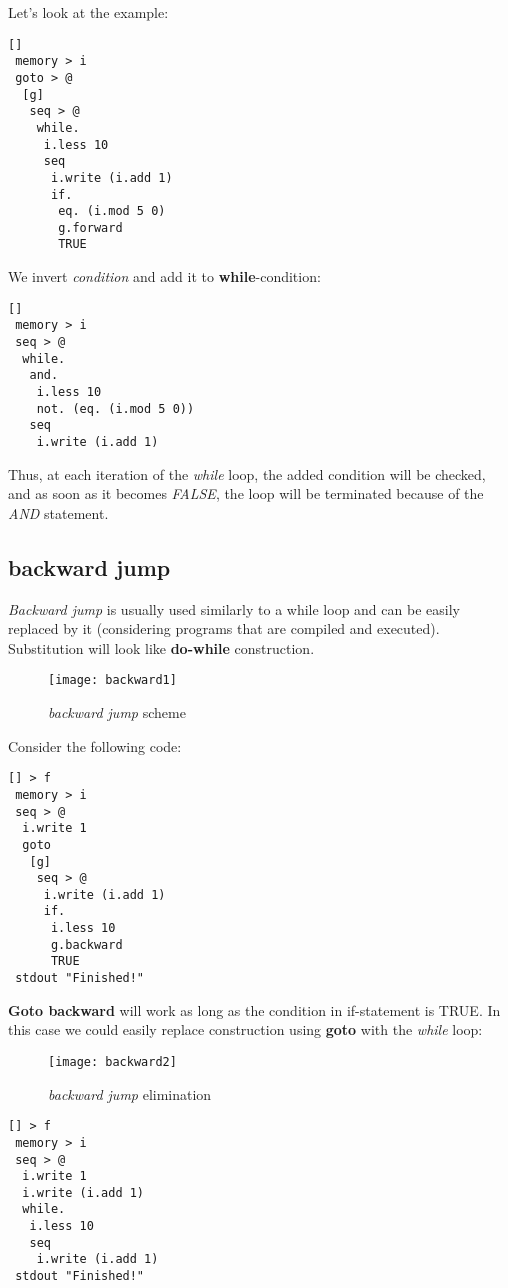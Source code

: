 \documentclass[two column]{article}
\begin{document}
Let's look at the example:
\begin{lstlisting}
[]
 memory > i
 goto > @
  [g]
   seq > @
    while.
     i.less 10
     seq
      i.write (i.add 1)
      if.
       eq. (i.mod 5 0)
       g.forward
       TRUE
\end{lstlisting}

We invert \textit{condition} and add it to \textbf{while}-condition:
\begin{lstlisting}
[]
 memory > i
 seq > @
  while.
   and.
    i.less 10
    not. (eq. (i.mod 5 0))
   seq
    i.write (i.add 1)
\end{lstlisting}

Thus, at each iteration of the \textit{while} loop, the added condition will be checked, and as soon as it becomes \textit{FALSE}, the loop will be terminated because of the \textit{AND} statement.

\subsection{backward jump}
\textit{Backward jump} is usually used similarly to a while loop and can be easily replaced by it (considering programs that are compiled and executed). Substitution will look like \textbf{do-while} construction.

\begin{figure}[h]
    \centering
    \texttt{[image: backward1]}
    \caption{\textit{backward jump} scheme}
    \label{fig:my_label}
\end{figure}

Consider the following code:
\begin{lstlisting}
[] > f
 memory > i
 seq > @
  i.write 1
  goto
   [g]
    seq > @
     i.write (i.add 1)
     if.
      i.less 10
      g.backward
      TRUE
 stdout "Finished!"
\end{lstlisting}

\textbf{Goto backward} will work as long as the condition in if-statement is TRUE. In this case we could easily replace construction using \textbf{goto} with the \textit{while} loop:

\begin{figure}[h]
    \centering
    \texttt{[image: backward2]}
    \caption{\textit{backward jump} elimination}
    \label{fig:my_label}
\end{figure}

\begin{lstlisting}
[] > f
 memory > i
 seq > @
  i.write 1
  i.write (i.add 1)
  while.
   i.less 10
   seq
    i.write (i.add 1)
 stdout "Finished!"
\end{lstlisting}
\end{document}
